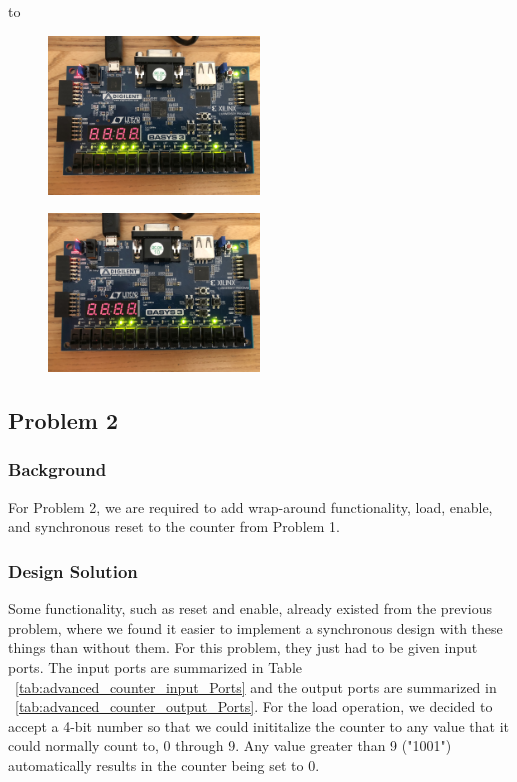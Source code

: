 to\documentclass[11pt]{article}
\begin{document}
\begin{figure}[H]
\begin{center}
	\includegraphics[width=0.5\textwidth]{./images/Part1/l9p1img8.jpg}
	\caption{\label{fig:part1_img8}}
\end{center}
\end{figure}

\begin{figure}[H]
\begin{center}
	\includegraphics[width=0.5\textwidth]{./images/Part1/l9p1img9.jpg}
	\caption{\label{fig:part1_img9}}
\end{center}
\end{figure}


\subsection{Problem 2 }

\subsubsection{Background}
For Problem 2, we are required to add wrap-around functionality, load, enable, and synchronous reset to the counter from Problem 1.

\subsubsection{Design Solution}
Some functionality, such as reset and enable, already existed from the previous problem, where we found it easier to implement a synchronous design with these things than without them. For this problem, they just had to be given input ports. The input ports are summarized in Table ~\ref{tab:advanced_counter_input_Ports} and the output ports are summarized in ~\ref{tab:advanced_counter_output_Ports}. For the load operation, we decided to accept a 4-bit number so that we could inititalize the counter to any value that it could normally count to, 0 through 9. Any value greater than 9 ("1001") automatically results in the counter being set to 0.
\end{document}
